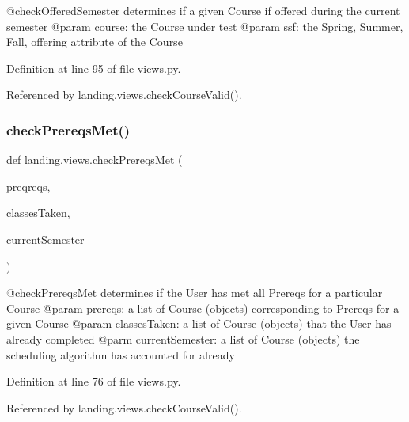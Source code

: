 \begin{DoxyVerb}@checkOfferedSemester determines if a given Course if offered during the current semester
@param course: the Course under test
@param ssf: the Spring, Summer, Fall, offering attribute of the Course
\end{DoxyVerb}
 

Definition at line 95 of file views.\+py.



Referenced by landing.\+views.\+check\+Course\+Valid().

\mbox{\label{namespacelanding_1_1views_aebd6e45208c4d8a81796c95fa03c029a}} 
\subsubsection{\texorpdfstring{check\+Prereqs\+Met()}{checkPrereqsMet()}}
{\footnotesize\ttfamily def landing.\+views.\+check\+Prereqs\+Met (\begin{DoxyParamCaption}\item[{}]{preqreqs,  }\item[{}]{classes\+Taken,  }\item[{}]{current\+Semester }\end{DoxyParamCaption})}

\begin{DoxyVerb}@checkPrereqsMet determines if the User has met all Prereqs for a particular Course
@param prereqs: a list of Course (objects) corresponding to Prereqs for a given Course
@param classesTaken: a list of Course (objects) that the User has already completed
@parm currentSemester: a list of Course (objects) the scheduling algorithm has accounted for already
\end{DoxyVerb}
 

Definition at line 76 of file views.\+py.



Referenced by landing.\+views.\+check\+Course\+Valid().

\mbox{\label{namespacelanding_1_1views_aa4736d3c8ed65938a640bd054c1fb588}} 
